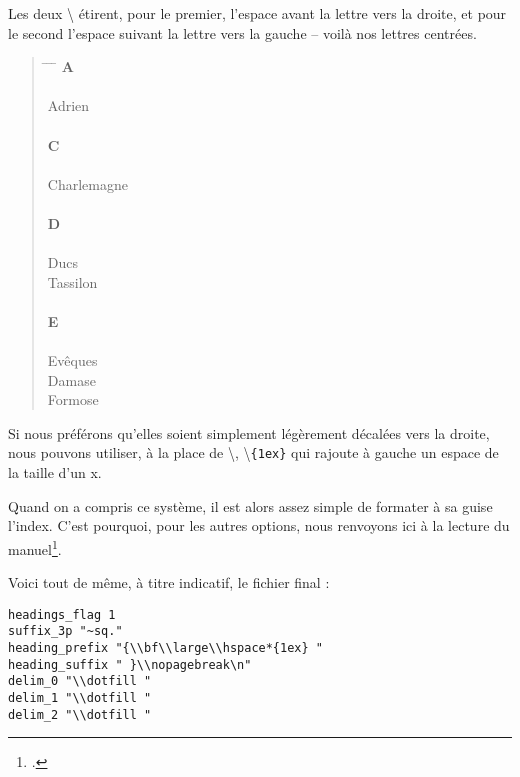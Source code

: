 Les deux \textbackslash{} étirent, pour le premier, l'espace avant la lettre vers la droite, et pour le second l'espace suivant la lettre vers la gauche -- voilà nos lettres centrées.

\begin{quotation}
\begin{tabbing}
\hspace{0,5cm}  \= \hspace{1cm} \= \hspace{1,5cm} \= \kill
\>\> \large{\textbf{A}}\\
\\
Adrien\>\> \\
\\
\>\> \large{\textbf{C}}\\
\\
Charlemagne \>\> \\
\\
\>\> \large{\textbf{D}}\\
\\
Ducs \\
\> Tassilon\>\\
\\
\>\> \large{\textbf{E}}\\
\\
Evêques \\
\> Damase \>\\
\> Formose\>\\

\end{tabbing}
\end{quotation}


Si nous préférons qu'elles soient simplement légèrement décalées vers la droite, nous pouvons utiliser, à la place de \textbackslash{}, \textbackslash{}\verb|{1ex}| qui rajoute à gauche un espace de la taille d'un x. 


Quand on a compris ce système, il est alors assez simple de formater à sa guise l'index. C'est pourquoi, pour les autres options, nous renvoyons ici à la lecture du manuel\footcite[On pourra aussi consulter][]{frama_index}. 

Voici tout de même, à titre indicatif, le fichier final :

\begin{verbatim}
headings_flag 1
suffix_3p "~sq."
heading_prefix "{\\bf\\large\\hspace*{1ex} " 
heading_suffix " }\\nopagebreak\n" 
delim_0 "\\dotfill "
delim_1 "\\dotfill "
delim_2 "\\dotfill "
\end{verbatim}




